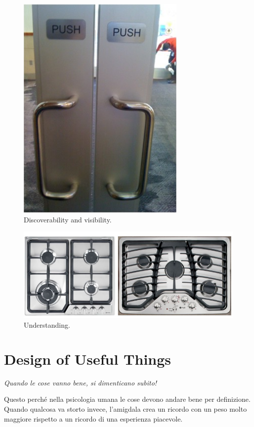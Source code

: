 \documentclass[a4paper,11pt,oneside]{book}
\begin{document}
\begin{figure}[!h]
	\centering
	\includegraphics[scale=0.3]{immagini/vis.png}
	\caption{Discoverability and visibility.}
\end{figure}

\begin{figure}[!h]
	\centering
	\includegraphics[scale=0.5]{immagini/Fornelli}
	\caption{Understanding.}
\end{figure}

\pagebreak

\section{Design of Useful Things}
\begin{flushleft}
	\textit{Quando le cose vanno bene, si dimenticano subito!}
\end{flushleft}
Questo perché nella psicologia umana le cose devono andare bene per definizione. Quando qualcosa va storto invece, l'amigdala crea un ricordo con un peso molto maggiore rispetto a un ricordo di una esperienza piacevole.
\end{document}

